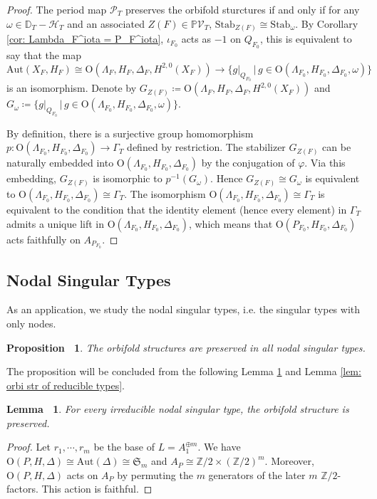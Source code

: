 \documentclass[12pt,reqno,a4paper]{amsart}
\newtheorem{lem}[thm]{Lemma~}
\newtheorem{prop}[thm]{Proposition~}
\theoremstyle{remark}
\theoremstyle{definition}
\newcommand{\ZZ}{\mathbb{Z}}
\newcommand{\PP}{\mathbb{P}}
\newcommand{\DD}{\mathbb{D}}
\newcommand{\Prd}{\mathscr{P}}
\newcommand{\calH}{\mathcal{H}}
\newcommand{\calV}{\mathcal{V}}
\newcommand\Aut{\mathrm{Aut}}
\newcommand\Or{\mathrm{O}}
\newcommand\Stab{\mathrm{Stab}}
\begin{document}
\begin{proof}
The period map $\Prd_T$ preserves the orbifold sturctures if and only if for any $\omega\in \DD_T-\calH_T$ and an associated $Z(F)\in \PP\calV_T$, $\Stab_{Z(F)} \cong \Stab_\omega$.
By Corollary \ref{cor: Lambda_F^iota = P_F^iota}, $\iota_{F_0}$ acts as $-1$ on $Q_{F_0}$, this is equivalent to say that the map
\begin{equation*}
    \Aut(X_F,H_F)\cong \Or(\Lambda_F,H_F,\Delta_F,H^{2,0}(X_F)) \to \{ g|_{Q_{F_0}} \,\big|\, g\in \Or(\Lambda_{F_0},H_{F_0},\Delta_{F_0},\omega) \}
\end{equation*}
is an isomorphism.
Denote by $G_{Z(F)}\coloneqq \Or(\Lambda_F,H_F,\Delta_F,H^{2,0}(X_F))$ and $G_\omega\coloneqq \{ g|_{Q_{F_0}} \,\big|\, g\in \Or(\Lambda_{F_0},H_{F_0},\Delta_{F_0},\omega) \}$.

By definition, there is a surjective group homomorphism $p\colon \Or(\Lambda_{F_0},H_{F_0},\Delta_{F_0})\to \Gamma_T$ defined by restriction.
The stabilizer $G_{Z(F)}$ can be naturally embedded into $\Or(\Lambda_{F_0},H_{F_0},\Delta_{F_0})$ by the conjugation of $\varphi$.
Via this embedding, $G_{Z(F)}$ is isomorphic to $p^{-1}(G_\omega)$.
Hence $G_{Z(F)} \cong G_\omega$ is equivalent to $\Or(\Lambda_{F_0},H_{F_0},\Delta_{F_0}) \cong \Gamma_T$.
The isomorphism $\Or(\Lambda_{F_0},H_{F_0},\Delta_{F_0}) \cong \Gamma_T$ is equivalent to the condition that the identity element (hence every element) in $\Gamma_T$ admits a unique lift in $\Or(\Lambda_{F_0},H_{F_0},\Delta_{F_0})$, which means that $\Or(P_{F_0},H_{F_0},\Delta_{F_0})$ acts faithfully on $A_{P_{F_0}}$.
\end{proof}


\subsection{Nodal Singular Types}
As an application, we study the nodal singular types, i.e. the singular types with only nodes.
\begin{prop}
\label{prop: orbi str of nodal types}
    The orbifold structures are preserved in all nodal singular types.
\end{prop}
The proposition will be concluded from the following Lemma \ref{lem: orbi str of irred nodal types} and Lemma \ref{lem: orbi str of reducible types}.
\begin{lem}
\label{lem: orbi str of irred nodal types}
    For every irreducible nodal singular type, the orbifold structure is preserved.
\end{lem}
\begin{proof}
    Let $r_1,\cdots,r_m$ be the base of $L=A_1^{\oplus m}$.
    We have $\Or(P,H,\Delta)\cong\Aut(\Delta)\cong\mathfrak{S}_m$ and $A_P\cong\ZZ/2\times(\ZZ/2)^m$.
    Moreover, $\Or(P,H,\Delta)$ acts on $A_P$ by permuting the $m$ generators of the later $m$ $\ZZ/2$-factors.
    This action is faithful.
\end{proof}
\end{document}
